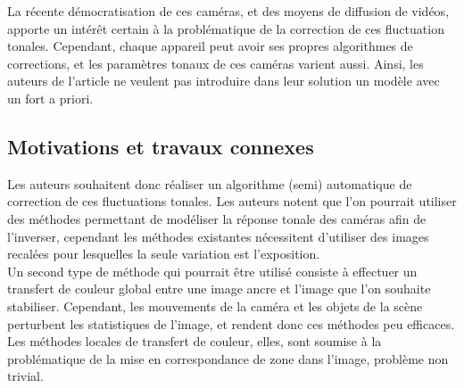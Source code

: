 La récente démocratisation de ces caméras, et des moyens de diffusion de vidéos, apporte un intérêt certain à la problématique de la correction de ces fluctuation tonales. Cependant, chaque appareil peut avoir ses propres algorithmes de corrections, et les paramètres tonaux de ces caméras varient aussi. Ainsi, les auteurs de l'article ne veulent pas introduire dans leur solution un modèle avec un fort a priori.\\

\subsection{Motivations et travaux connexes}
Les auteurs souhaitent donc réaliser un algorithme (semi) automatique de correction de ces fluctuations tonales. Les auteurs notent que l'on pourrait utiliser des méthodes permettant de modéliser la réponse tonale des caméras afin de l'inverser, cependant les méthodes existantes nécessitent d'utiliser des images recalées pour lesquelles la seule variation est l'exposition.\\

Un second type de méthode qui pourrait être utilisé consiste à effectuer un transfert de couleur global entre une image ancre et l'image que l'on souhaite stabiliser. Cependant, les mouvements de la caméra et les objets de la scène perturbent les statistiques de l'image, et rendent  donc ces méthodes peu efficaces. Les méthodes locales de transfert de couleur, elles, sont soumise à la problématique de la mise en correspondance de zone dans l'image, problème non trivial.\\

